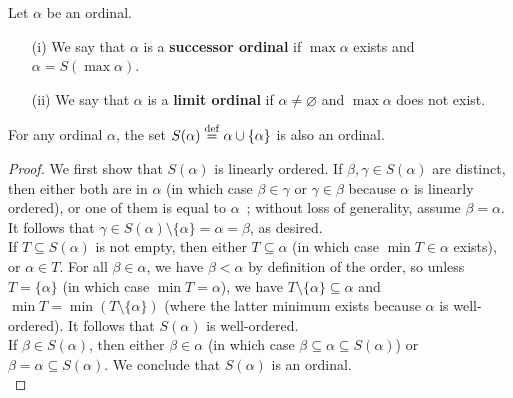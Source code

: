 \begin{definition} \label{successor-and-limit-ordinals}
    Let $\alpha$ be an ordinal.
    \\

    \begin{itemize}
        \item[(i)] We say that $\alpha$ is a \textbf{successor ordinal} if $\max \alpha$ exists and $\alpha = S(\max \alpha)$.
        \\
        
        \item[(ii)] We say that $\alpha$ is a \textbf{limit ordinal} if $\alpha \neq \varnothing$ and $\max \alpha$ does not exist.
        \\

    \end{itemize}
\end{definition}

\begin{lemma} \label{successor-ordinals}
    For any ordinal $\alpha$, the set $S(\alpha) \overset{\mathrm{def}}{=} \alpha \cup \{\alpha\}$ is also an ordinal.
\end{lemma}

\begin{proof}
    We first show that $S(\alpha)$ is linearly ordered. If $\beta,\gamma \in S(\alpha)$ are distinct, then either both are in $\alpha$ (in which case $\beta \in \gamma$ or $\gamma \in \beta$ because $\alpha$ is linearly ordered), or one of them is equal to $\alpha$~; without loss of generality, assume $\beta = \alpha$. It follows that $\gamma \in S(\alpha) \setminus \{\alpha\} = \alpha = \beta$, as desired.
    \\

    If $T \subseteq S(\alpha)$ is not empty, then either $T \subseteq \alpha$ (in which case $\min T \in \alpha$ exists), or $\alpha \in T$. For all $\beta \in \alpha$, we have $\beta < \alpha$ by definition of the order, so unless $T = \{\alpha\}$ (in which case $\min T = \alpha$), we have $T \setminus \{\alpha\} \subseteq \alpha$ and $\min T = \min (T \setminus \{\alpha\})$ (where the latter minimum exists because $\alpha$ is well-ordered). It follows that $S(\alpha)$ is well-ordered. 
    \\

    If $\beta \in S(\alpha)$, then either $\beta \in \alpha$ (in which case $\beta \subseteq \alpha \subseteq S(\alpha)$) or $\beta = \alpha \subseteq S(\alpha)$. We conclude that $S(\alpha)$ is an ordinal.
    \\
\end{proof}

